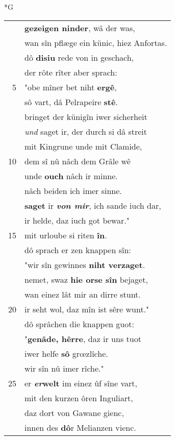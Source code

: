 \documentclass[8pt,a4paper,notitlepage]{article}
\begin{document}
\newpage
\begin{table}[ht]
\begin{minipage}[t]{0.5\linewidth}
\small
\begin{center}*G
\end{center}
\begin{tabular}{rl}
 & \textbf{gezeigen ninder}, wâ der was,\\ 
 & wan sîn pflæge ein künic, hiez Anfortas.\\ 
 & dô \textbf{disiu} rede von in geschach,\\ 
 & der rôte rîter aber sprach:\\ 
5 & "obe mîner bet niht \textbf{ergê},\\ 
 & sô vart, dâ Pelrapeire \textbf{stê}.\\ 
 & bringet der künigîn iwer sicherheit\\ 
 & \textit{und} saget ir, der durch si dâ streit\\ 
 & mit Kingrune unde mit Clamide,\\ 
10 & dem sî nû nâch dem Grâle wê\\ 
 & unde \textbf{ouch} nâch ir minne.\\ 
 & nâch beiden ich imer sinne.\\ 
 & \textbf{saget} ir \textit{\textbf{von mir}}, ich sande iuch dar,\\ 
 & ir helde, daz iuch got bewar."\\ 
15 & mit urloube si riten \textbf{în}.\\ 
 & dô sprach er zen knappen sîn:\\ 
 & "wir sîn gewinnes \textbf{niht verzaget}.\\ 
 & nemet, swaz \textbf{hie orse sîn} bejaget,\\ 
 & wan einez lât mir an dirre stunt.\\ 
20 & ir seht wol, daz mîn ist sêre wunt."\\ 
 & dô sprâchen die knappen guot:\\ 
 & "\textbf{genâde, hêrre}, daz ir uns tuot\\ 
 & iwer helfe \textbf{sô} grœzlîche.\\ 
 & wir sîn nû imer rîche."\\ 
25 & er \textbf{\textit{er}welt} im einez ûf sîne vart,\\ 
 & mit den kurzen ôren Inguliart,\\ 
 & daz dort von Gawane gienc,\\ 
 & innen des \textbf{dô}r Melianzen vienc.\\ 

\end{tabular}
\end{minipage}
\end{table}
\end{document}
